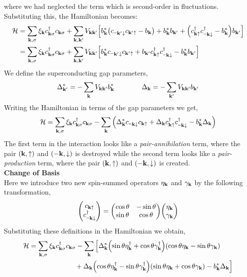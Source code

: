 \documentclass{article}
\newcommand{\SH}{\mathcal{H}}
\newcommand{\vk}{\vb{k}}
\newcommand{\sm}{\mathord{\scalebox{0.6}[1]{$-$}}}
\newcommand{\vkd}{\vb{k}'}
\newcommand{\vks}{\vb{k}\sigma}
\newcommand{\cksd}{c^{\dagger}_{\vks}}
\newcommand{\kup}{\vk\uparrow}
\newcommand{\kdown}{\sm\vk\downarrow}
\newcommand{\kdup}{\vk'\uparrow}
\newcommand{\kddown}{\sm\vk'\downarrow}
\newcommand{\cks}{c_{\vks}}
\newcommand{\cd}{c^\dagger}
\begin{document}
where we had neglected the term which is second-order in fluctuations. Substituting this, the Hamiltonian becomes:
\begin{align}
   \begin{split}
     \SH &= \sum\limits_{\vk, \sigma}\xi_{\vk}\cksd\cks + \sum\limits_{\vk, \vkd}V_{\vk\vkd} \qty[b_{\vk}^*\qty(c_{\kddown}c_{\kdup}-b_{\vk}) +{b_{\vk}^*b_{\vk'}} + \qty(\cd_{\kup}\cd_{\kdown} - b_{\vk}^*)b_{{\vk}'}]\\
    &=\sum\limits_{\vk, \sigma}\xi_{\vk}\cksd\cks + \sum\limits_{\vk, \vkd}V_{\vk\vkd} \qty[b_{\vk}^*c_{\kddown}c_{\kdup} + b_{{\vk}'}\cd_{\kup}\cd_{\kdown} - b_{\vk}^*b_{{\vk}'}]
   \end{split}
\end{align}
We define the superconducting gap parameters,
\begin{equation}
    \Delta_{\vkd}^* = - \sum\limits_{\vk} V_{\vk\vkd}b_{\vk}^* \qquad\qquad \Delta_{\vk} = - \sum\limits_{\vkd} V_{\vk\vkd}b_{\vkd}
\end{equation}
Writing the Hamiltonian in terms of the gap parameters we get,
\begin{equation}
    \SH = \sum\limits_{\vk, \sigma}\xi_{\vk}\cksd\cks - \sum\limits_{\vk}\qty( \Delta_{\vk}^*c_{\kdown}c_{\kup} + \Delta_{\vk}c^\dagger_{\kup}c^\dagger_{\kdown} - b_{\vk}^*\Delta_{\vk})
\end{equation}
The first term in the interaction looks like a \textit{pair-annihilation} term, where the pair $(\vk,\uparrow)$ and $(-\vk,\downarrow)$ is destroyed while the second term looks like a \textit{pair-production} term, where the pair $(\vk,\uparrow)$ and $(-\vk,\downarrow)$ is created.\\[0.2cm]
\textbf{\large Change of Basis}\\[0.2cm]
Here we introduce two new spin-summed operators $\eta_{\vk}$ and $\gamma_{\vk}$ by the following transformation,
\begin{equation}
    \mqty(c_{\kup}\\ c_{\kdown}^\dagger) = \mqty(\cos\theta & -\sin\theta \\ \sin\theta & \cos\theta) \mqty(\eta_{\vk}\\ \gamma_{\vk})
\end{equation}
Substituting these definitions in the Hamiltonian we obtain,
\begin{align}
    \begin{split}
        \SH &= \sum\limits_{\vk, \sigma}\xi_{\vk}\cksd\cks - \sum\limits_{\vk}\Big[ \Delta_{\vk}^*\qty(\sin\theta \eta_{\vk}^\dagger +\cos\theta \gamma_{\vk}^\dagger )\qty(\cos\theta \eta_{\vk}-\sin\theta \gamma_{\vk})\\
        &\quad\hspace*{2cm}+\Delta_{\vk}\qty(\cos\theta \eta_{\vk}^\dagger -\sin\theta \gamma_{\vk}^\dagger)\qty(\sin\theta \eta_{\vk}+\cos\theta \gamma_{\vk}) - b_{\vk}^*\Delta_{\vk}\Big]
    \end{split}
\end{align}
\end{document}
